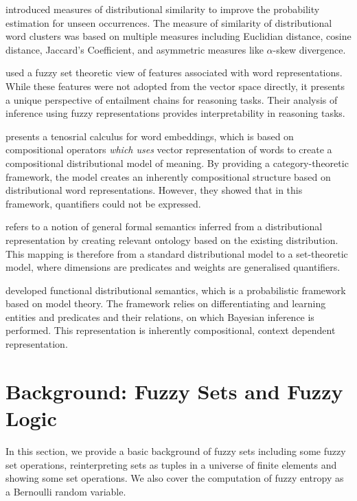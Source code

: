 \documentclass[11pt,a4paper]{article}
\begin{document}
\citet{lee1999measures} introduced measures of distributional similarity to improve the probability estimation for unseen occurrences. The measure of similarity of distributional word clusters was based on multiple measures including Euclidian distance, cosine distance, Jaccard's Coefficient, and asymmetric measures like $\alpha$-skew divergence.

\citet{bergmair2011monte} used a fuzzy set theoretic view of features associated with word representations. While these features were not adopted from the vector space directly, it presents a unique perspective of entailment chains for reasoning tasks. Their analysis of inference using fuzzy representations provides interpretability in reasoning tasks.

\citet{grefenstette2013towards} presents a tenosrial calculus for word embeddings, which is based on compositional operators \emph{which uses} vector representation of words to create a compositional distributional model of meaning. By providing a category-theoretic framework, the model creates an inherently compositional structure based on distributional word representations. However, they showed that in this framework, quantifiers could not be expressed.

\citet{herbelot2015building} refers to a notion of general formal semantics inferred from a distributional representation by creating relevant ontology based on the existing distribution. This mapping is therefore from a standard distributional model to a set-theoretic model, where dimensions are predicates and weights are generalised quantifiers. 

\citet{emerson2016functional, emerson2017semantic} developed functional distributional semantics, which is a probabilistic framework based on model theory. The framework relies on differentiating and learning entities and predicates and their relations, on which Bayesian inference is performed. This representation is inherently compositional, context dependent representation. 

\section{Background: Fuzzy Sets and Fuzzy Logic}
\label{sec: math}

In this section, we provide a basic background of fuzzy sets including some fuzzy set operations, reinterpreting sets as tuples in a universe of finite elements and showing some set operations. We also cover the computation of fuzzy entropy as a Bernoulli random variable. 
\end{document}
